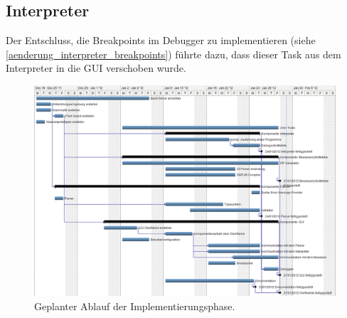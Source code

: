 \subsection{Interpreter}
Der Entschluss, die Breakpoints im Debugger zu implementieren (siehe \ref{aenderung_interpreter_breakpoints}) führte dazu, dass dieser Task aus dem Interpreter in die GUI verschoben wurde.

\begin{landscape}%
	\begin{figure}%
		\vspace{-2cm}
		\includegraphics[height=1.2\textheight]{images/gantt_implementierung_diag.png}%
		\caption{Geplanter Ablauf der Implementierungsphase.}%
	\end{figure}%
\end{landscape}
